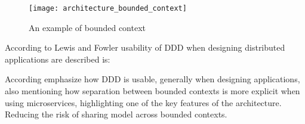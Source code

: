 \begin{figure}[!htb]
  \texttt{[image: architecture\_bounded\_context]}  
  \caption{An example of bounded context}
  \label{fig:architecture_bounded_context}
\end{figure}


According to Lewis and Fowler\cite{fowler2014microservices} usability of DDD when designing distributed applications are described is:


According  emphasize how DDD is usable, generally when designing applications, also mentioning how separation between bounded contexts is more explicit when using microservices, highlighting one of the key features of the architecture. Reducing the risk of sharing model across bounded contexts.

